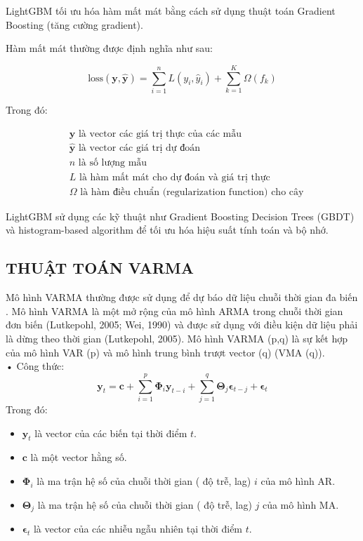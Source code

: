 \documentclass{article}
\begin{document}
\begin{multicols}{2}
LightGBM tối ưu hóa hàm mất mát bằng cách sử dụng thuật toán Gradient Boosting (tăng cường gradient).

Hàm mất mát thường được định nghĩa như sau:

\[
\text{loss}(\mathbf{y}, \hat{\mathbf{y}}) = \sum_{i=1}^{n} L(y_i, \hat{y}_i) + \sum_{k=1}^{K} \Omega(f_k)
\]

Trong đó:

\begin{align*}
&\mathbf{y} \text{ là vector các giá trị thực của các mẫu} \\
&\hat{\mathbf{y}} \text{ là vector các giá trị dự đoán} \\
&n \text{ là số lượng mẫu} \\
&L \text{ là hàm mất mát cho dự đoán và giá trị thực} \\
&\Omega \text{ là hàm điều chuẩn (regularization function) cho cây}
\end{align*}

LightGBM sử dụng các kỹ thuật như Gradient Boosting Decision Trees (GBDT) và histogram-based algorithm để tối ưu hóa hiệu suất tính toán và bộ nhớ.
\subsection{THUẬT TOÁN VARMA}
Mô hình VARMA thường được sử dụng để dự báo dữ liệu chuỗi thời gian đa biến . Mô hình VARMA là một mở rộng của mô hình ARMA trong chuỗi thời gian đơn biến (Lutkepohl, 2005; Wei, 1990) và được sử dụng với điều kiện dữ liệu phải là dừng theo thời gian (Lutkepohl, 2005). Mô hình VARMA (p,q) là sự kết hợp của mô hình VAR (p) và mô hình trung bình trượt vector (q) (VMA (q)).\\
 
    • Công thức:
    \begin{equation}
        \mathbf{y}_t = \mathbf{c} + \sum_{i=1}^{p} \mathbf{\Phi}_i \mathbf{y}_{t-i} + \sum_{j=1}^{q} \mathbf{\Theta}_j \boldsymbol{\epsilon}_{t-j} + \boldsymbol{\epsilon}_t
    \end{equation}  
Trong đó:  
    \begin{itemize}
      \item \( \mathbf{y}_t \) là vector của các biến tại thời điểm \( t \).
      \item \( \mathbf{c} \) là một vector hằng số.
      \item \( \mathbf{\Phi}_i \) là ma trận hệ số của chuỗi thời gian ( độ trễ, lag) \( i \) của mô hình AR.
      \item \( \mathbf{\Theta}_j \) là ma trận hệ số của chuỗi thời gian ( độ trễ, lag) \( j \) của mô hình MA.
      \item \( \boldsymbol{\epsilon}_t \) là vector của các nhiễu ngẫu nhiên tại thời điểm \( t \).
    \end{itemize} 

\end{multicols}
\end{document}
